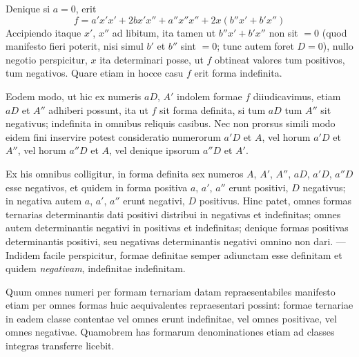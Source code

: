 Denique si \(a=0\), erit
\[
f=a'x'x'+2bx'x''+a''x''x''+2x(b''x'+b'x'')
\]
Accipiendo itaque \(x'\), \(x''\) ad libitum, ita tamen ut \(b''x'+b'x''\) non sit \(=0\) (quod manifesto fieri poterit, nisi simul \(b'\) et \(b''\) sint \(=0\); tunc autem foret \(D=0\)), nullo negotio perspicitur, \(x\) ita determinari posse, ut \(f\) obtineat valores tum positivos, tum negativos. Quare etiam in hocce casu \(f\) erit forma indefinita.

Eodem modo, ut hic ex numeris \(aD\), \(A'\) indolem formae \(f\) diiudicavimus, etiam \(aD\) et \(A''\) adhiberi possunt, ita ut \(f\) sit forma definita, si tum \(aD\) tum \(A''\) sit negativus; indefinita in omnibus reliquis casibus. Nec non prorsus simili modo eidem fini inservire potest consideratio numerorum \(a'D\) et \(A\), vel horum \(a'D\) et \(A''\), vel horum \(a''D\) et \(A\), vel denique ipsorum \(a''D\) et \(A'\).

Ex his omnibus colligitur, in forma definita sex numeros \(A\), \(A'\), \(A''\), \(aD\), \(a'D\), \(a''D\) esse negativos, et quidem in forma positiva \(a\), \(a'\), \(a''\) erunt positivi, \(D\) negativus; in negativa autem \(a\), \(a'\), \(a''\) erunt negativi, \(D\) positivus. Hinc patet, omnes formas ternarias determinantis dati positivi distribui in negativas et indefinitas; omnes autem determinantis negativi in positivas et indefinitas; denique formas positivas determinantis positivi, seu negativas determinantis negativi omnino non dari. --- Indidem facile perspicitur, formae definitae semper adiunctam esse definitam et quidem \emph{negativam}, indefinitae indefinitam.

Quum omnes numeri per formam ternariam datam repraesentabiles manifesto etiam per omnes formas huic aequivalentes repraesentari possint: formae ternariae in eadem classe contentae vel omnes erunt indefinitae, vel omnes positivae, vel omnes negativae. Quamobrem has formarum denominationes etiam ad classes integras transferre licebit.

